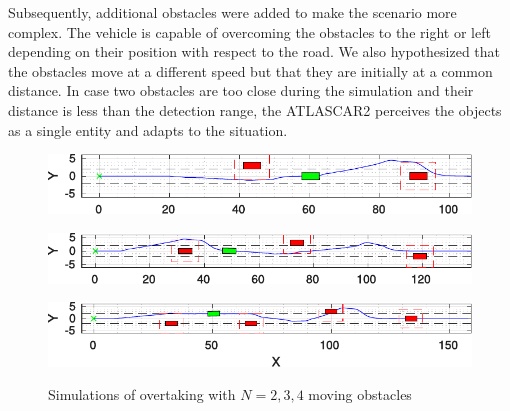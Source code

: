 \documentclass[conference, 11pt]{IEEEtran}
\begin{document}
Subsequently, additional obstacles were added to make the scenario more complex. The vehicle is capable of overcoming the obstacles to the right or left depending on their position with respect to the road. We also hypothesized that the obstacles move at a different speed but that they are initially at a common distance. In case two obstacles are too close during the simulation and their distance is less than the detection range, the ATLASCAR2 perceives the objects as a single entity and adapts to the situation.

\begin{figure}[!h]
	\centering
	\includegraphics[width=1\columnwidth]{../../MATLAB/random_N_obstacles/figure/overtaking_random_2.pdf}
	\label{fig:obstacleAvoidance_random_2}
	\vspace{-1.3em}
\end{figure}
\begin{figure}[!h]
	\centering
	\includegraphics[width=1\columnwidth]{../../MATLAB/random_N_obstacles/figure/overtaking_random.pdf}
	\label{fig:obstacleAvoidance_random}
	\vspace{-1.3em}
\end{figure}
\begin{figure}[!h]
	\centering
	\includegraphics[width=1\columnwidth]{../../MATLAB/random_N_obstacles/figure/overtaking_random_1.pdf}
	\label{fig:obstacleAvoidance_random_1}
	\vspace{-1.2em}
	\caption{Simulations of overtaking with $N = 2,3,4$ moving obstacles}
\end{figure}
\end{document}
